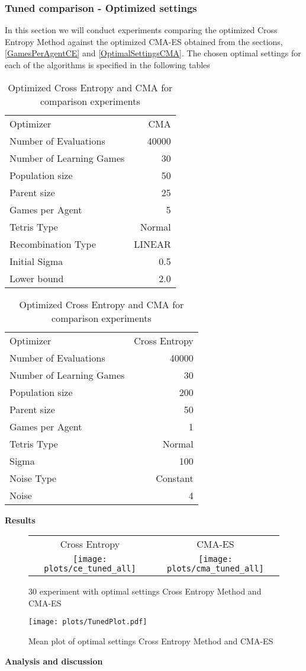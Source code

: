 \subsubsection{Tuned comparison - Optimized settings \label{tunedComparison}}
In this section we will conduct experiments comparing the optimized Cross Entropy Method 
against the
optimized CMA-ES obtained from the sections, \ref{GamesPerAgentCE} and \ref{OptimalSettingsCMA}.
The chosen optimal settings for each of the algorithms is specified in the following tables
\begin{table}[h]
\centering
\begin{tabular}{l r}
Optimizer & CMA\\
Number of Evaluations & 40000\\
Number of Learning Games & 30\\
Population size& 50\\
Parent size & 25\\
Games per Agent & 5\\
Tetris Type & Normal\\
\hline
Recombination Type & LINEAR\\
Initial Sigma & 0.5\\
Lower bound & 2.0\\
\end{tabular}
\quad
\begin{tabular}{l r}
Optimizer & Cross Entropy\\
Number of Evaluations & 40000\\
Number of Learning Games & 30\\
Population size & 200\\
Parent size & 50\\
Games per Agent & 1\\
Tetris Type & Normal\\
\hline
Sigma & 100\\
Noise Type & Constant\\
Noise & 4
\end{tabular}
\caption{Optimized Cross Entropy and CMA for comparison experiments}
\end{table}

\textbf{Results}\\

\begin{figure}[H]
\begin{tabular}{@{}c@{}c@{}}
Cross Entropy & CMA-ES\\
\texttt{[image: plots/ce\_tuned\_all]} &
\texttt{[image: plots/cma\_tuned\_all]}
\end{tabular}
\caption{30 experiment with optimal settings Cross Entropy Method and CMA-ES}
\end{figure}

\begin{figure}[H]
\centering
\texttt{[image: plots/TunedPlot.pdf]}
\caption{Mean plot of optimal settings Cross Entropy Method and CMA-ES}
\end{figure}


\textbf{Analysis and discussion}\\

